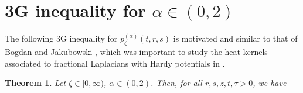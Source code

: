 \documentclass[12pt,reqno,a4paper]{amsart}
\newtheorem{theorem}{Theorem}[section]
\theoremstyle{definition}
\theoremstyle{remark}
\numberwithin{equation}{section}
\newcommand{\1}{\mathbbm{1}}
\newcommand{\one}{\mathbf{1}}
\begin{document}
\section{3G inequality for $\alpha\in(0,2)$}
\label{s:3g}

The following 3G inequality for $p_\zeta^{(\alpha)}(t,r,s)$ is motivated and similar to that of Bogdan and Jakubowski \cite[(7)--(9)]{BogdanJakubowski2007}, which was important to study the heat kernels associated to fractional Laplacians with Hardy potentials in \cite{Bogdanetal2019,JakubowskiWang2020}.

\begin{theorem}
  \label{3gheatalpha}
  Let $\zeta\in[0,\infty)$, $\alpha\in(0,2)$. Then, for all $r,s,z,t,\tau>0$, we have
  \begin{align}
    \label{eq:3gheatalpha1}
    \begin{split}

\end{split}
\end{align}
\end{theorem}
\end{document}
